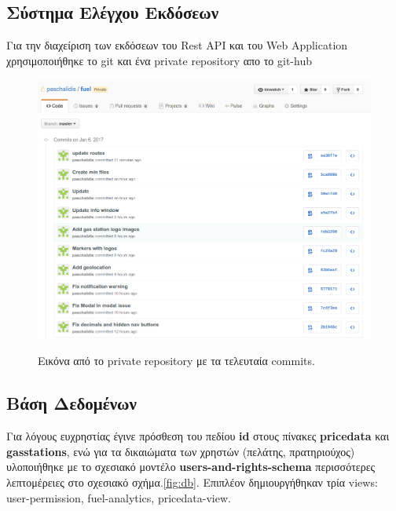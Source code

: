 \subsection{Σύστημα Ελέγχου Εκδόσεων}

Για την διαχείριση των εκδόσεων του Rest API και του Web Application χρησιμοποιήθηκε το git\footnotemark{} και ένα private repository απο το git-hub\footnotemark{}

\begin{figure}[H]
  \caption{Εικόνα από το private repository με τα τελευταία commits.}
  \centering
    \includegraphics[width=1\textwidth]{img/git.png}
    \label{fig:git}
\end{figure}

\subsection{Βάση Δεδομένων}
Για λόγους ευχρηστίας έγινε πρόσθεση του πεδίου \textbf{id} στους πίνακες \textbf{pricedata} και \textbf{gasstations}, ενώ για τα δικαιώματα των χρηστών (πελάτης, πρατηριούχος) υλοποιήθηκε με το σχεσιακό μοντέλο \textbf{users-and-rights-schema} περισσότερες λεπτομέρειες στο σχεσιακό σχήμα.\ref{fig:db}. Επιπλέον δημιουργήθηκαν τρία views: user-permission, fuel-analytics, pricedata-view.


